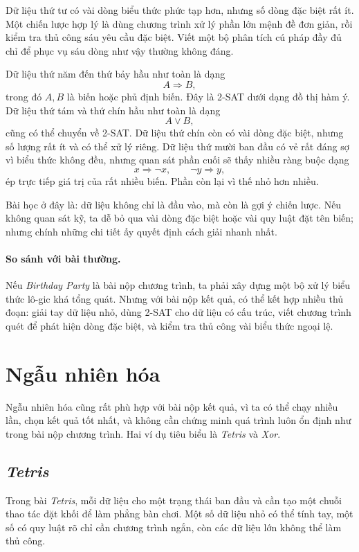 \documentclass[11pt]{article}
\begin{document}
Dữ liệu thứ tư có vài dòng biểu thức phức tạp hơn, nhưng số dòng đặc biệt rất
ít. Một chiến lược hợp lý là dùng chương trình xử lý phần lớn mệnh đề đơn
giản, rồi kiểm tra thủ công sáu yêu cầu đặc biệt. Viết một bộ phân tích cú
pháp đầy đủ chỉ để phục vụ sáu dòng như vậy thường không đáng.

Dữ liệu thứ năm đến thứ bảy hầu như toàn là dạng
\[
  A\Rightarrow B,
\]
trong đó \(A,B\) là biến hoặc phủ định biến. Đây là 2-SAT dưới dạng đồ thị
hàm ý. Dữ liệu thứ tám và thứ chín hầu như toàn là dạng
\[
  A\lor B,
\]
cũng có thể chuyển về 2-SAT. Dữ liệu thứ chín còn có vài dòng đặc biệt, nhưng
số lượng rất ít và có thể xử lý riêng. Dữ liệu thứ mười ban đầu có vẻ rất
đáng sợ vì biểu thức không đều, nhưng quan sát phần cuối sẽ thấy nhiều ràng
buộc dạng
\[
  x\Rightarrow \neg x,\qquad \neg y\Rightarrow y,
\]
ép trực tiếp giá trị của rất nhiều biến. Phần còn lại vì thế nhỏ hơn nhiều.

Bài học ở đây là: dữ liệu không chỉ là đầu vào, mà còn là gợi ý chiến lược.
Nếu không quan sát kỹ, ta dễ bỏ qua vài dòng đặc biệt hoặc vài quy luật đặt
tên biến; nhưng chính những chi tiết ấy quyết định cách giải nhanh nhất.

\paragraph{So sánh với bài thường.}
Nếu \textit{Birthday Party} là bài nộp chương trình, ta phải xây dựng một bộ
xử lý biểu thức lô-gic khá tổng quát. Nhưng với bài nộp kết quả, có thể kết
hợp nhiều thủ đoạn: giải tay dữ liệu nhỏ, dùng 2-SAT cho dữ liệu có cấu trúc,
viết chương trình quét để phát hiện dòng đặc biệt, và kiểm tra thủ công vài
biểu thức ngoại lệ.

\section{Ngẫu nhiên hóa}

Ngẫu nhiên hóa cũng rất phù hợp với bài nộp kết quả, vì ta có thể chạy nhiều
lần, chọn kết quả tốt nhất, và không cần chứng minh quá trình luôn ổn định
như trong bài nộp chương trình. Hai ví dụ tiêu biểu là \textit{Tetris} và
\textit{Xor}.

\subsection{\textit{Tetris}}

Trong bài \textit{Tetris}, mỗi dữ liệu cho một trạng thái ban đầu và cần tạo
một chuỗi thao tác đặt khối để làm phẳng bàn chơi. Một số dữ liệu nhỏ có thể
tính tay, một số có quy luật rõ chỉ cần chương trình ngắn, còn các dữ liệu
lớn không thể làm thủ công.
\end{document}
